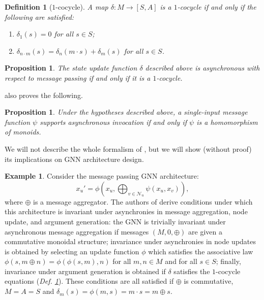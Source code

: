 \documentclass[11pt,a4paper,openright,twoside]{report}
\newcounter{mycounter}
\theoremstyle{plain}
\newtheorem{proposition}[mycounter]{Proposition}
\newtheorem{definition}[mycounter]{Definition}
\theoremstyle{definition}
\newtheorem{example}[mycounter]{Example}
\begin{document}
\begin{definition}[$1$-cocycle]
  A map $\delta: M \to [S,A]$ is a $1$-cocycle if and only if the following are satisfied:
  \begin{enumerate}
    \item $\delta_1(s) = 0$ for all $s \in S$;
    \item $\delta_{n \cdot m}(s) = \delta_{n}(m \cdot s) + \delta_m(s)$ for all $s \in S$.
  \end{enumerate} 
  \label{def: cocycle}
\end{definition}

\begin{proposition}
  The state update function $\delta$ described above is asynchronous with respect to message passing if and only if it is a $1$-cocycle.
\end{proposition}

\cite{dudzik2024asynchronous} also proves the following.

\begin{proposition}
  Under the hypotheses described above, a single-input message function $\psi$ supports asynchronous invocation if and only if $\psi$ is a homomorphism of monoids.
\end{proposition}

We will not describe the whole formalism of \cite{dudzik2024asynchronous}, but we will show (without proof) its implications on GNN architecture design. 

\begin{example}
  Consider the message passing GNN architecture:
  \[x_u' = \phi\left(x_u, \bigoplus_{v \in \mathcal{N}_u}\psi(x_{u},x_{v})\right),\]
  where $\oplus$ is a message aggregator. The authors of \cite{dudzik2024asynchronous} derive conditions under which this architecture is invariant under asynchronies in message aggregation, node update, and argument generation: the GNN is trivially invariant under asynchronous message aggregation if messages $(M,0,\oplus)$ are given a commutative monoidal structure; invariance under asynchronies in node updates is obtained by selecting an update function $\phi$ which satisfies the associative law $\phi(s,m \oplus n) = \phi(\phi(s,m),n)$ for all $m,n \in M$ and for all $s \in S$; finally, invariance under argument generation is obtained if $\delta$ satisfies the $1$-cocycle equations (\textit{Def. \ref{def: cocycle}}). 
  These conditions are all satisfied if $\oplus$ is commutative, $M=A=S$ and $\delta_m(s) = \phi(m,s) = m \cdot s = m \oplus s$.
\end{example}
\end{document}
